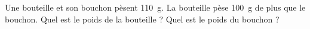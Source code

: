 Une bouteille et son bouchon pèsent \qty{110}{\gram}. 
La bouteille pèse \qty{100}{\gram} de plus que le bouchon. 
Quel est le poids de la bouteille ? Quel est le poids du bouchon ?